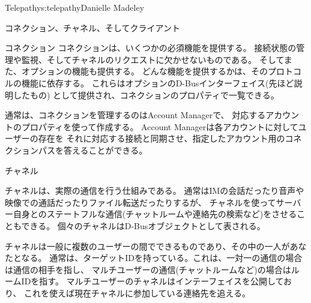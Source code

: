 \begin{aosachapter}{Telepathy}{s:telepathy}{Danielle Madeley}
\begin{aosasect1}{コネクション、チャネル、そしてクライアント}
\begin{aosasect2}{コネクション}
コネクションは、いくつかの必須機能を提供する。
接続状態の管理や監視、そしてチャネルのリクエストに欠かせないものである。
そしてまた、オプションの機能も提供する。
どんな機能を提供するかは、そのプロトコルの機能に依存する。
これらはオプションのD-Busインターフェイス(先ほど説明したもの)
として提供され、コネクションのプロパティで一覧できる。

通常は、コネクションを管理するのはAccount Managerで、
対応するアカウントのプロパティを使って作成する。
Account Managerは各アカウントに対してユーザーの存在を
それに対応する接続と同期させ、指定したアカウント用のコネクションパスを答えることができる。

\end{aosasect2}

\begin{aosasect2}{チャネル}

チャネルは、実際の通信を行う仕組みである。
通常はIMの会話だったり音声や映像での通話だったりファイル転送だったりするが、
チャネルを使ってサーバー自身とのステートフルな通信(チャットルームや連絡先の検索など)をさせることもできる。
個々のチャネルはD-Busオブジェクトとして表される。

チャネルは一般に複数のユーザーの間でできるものであり、その中の一人があなたとなる。
通常は、ターゲットIDを持っている。これは、一対一の通信の場合は通信の相手を指し、
マルチユーザーの通信(チャットルームなど)の場合はルームIDを指す。
マルチユーザーのチャネルはインテーフェイスを公開しており、
これを使えば現在チャネルに参加している連絡先を追える。


\end{aosasect2}
\end{aosasect1}
\end{aosachapter}
